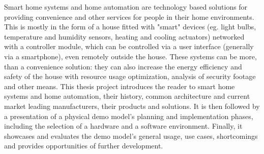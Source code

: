 Smart home systems and home automation are technology based solutions for providing convenience and other services for people in their home environments. This is mostly in the form of a house fitted with "smart" devices (eg. light bulbs, temperature and humidity sensors, heating and cooling actuators) networked with a controller module, which can be controlled via a user interface (generally via a smartphone), even remotely outside the house. These systems can be more, than a convenience solution: they can also increase the energy efficiency and safety of the house with resource usage optimization, analysis of security footage and other means. This thesis project introduces the reader to smart home systems and home automation, their history, common architecture and current market leading manufacturers, their products and solutions. It is then followed by a presentation of a physical demo model's planning and implementation phases, including the selection of a hardware and a software environment. Finally, it showcases and evaluates the demo model's general usage, use cases, shortcomings and provides opportunities of further development.

\vfill
\selectthesislanguage

\setcounter{romanPage}{\value{page}}
